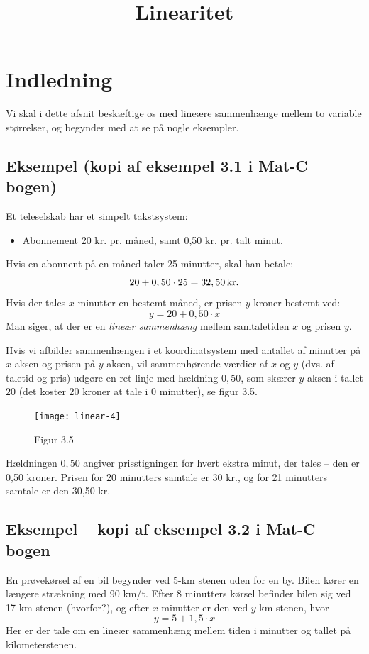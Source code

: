 \documentclass[12pt,oneside,a4paper]{article}
\title{Linearitet}
\date{\vspace{-5ex}}
\begin{document}
\maketitle

\section{Indledning}
Vi skal i dette afsnit beskæftige os med lineære sammenhænge mellem to variable
størrelser, og begynder med at se på nogle eksempler.

\subsection{Eksempel (kopi af eksempel 3.1 i Mat-C bogen)}
Et teleselskab har et simpelt takstsystem:
\begin{itemize}
    \item Abonnement 20 kr. pr. måned, samt 0,50 kr. pr. talt minut.
\end{itemize}
Hvis en abonnent på en måned taler 25 minutter, skal han betale:
$$
20 + 0,50\cdot25 = 32,50 \, {\rm kr}.
$$
Hvis der tales $x$ minutter en bestemt måned, er prisen $y$ kroner bestemt ved:
$$
y = 20 + 0,50\cdot x
$$
Man siger, at der er en {\em lineær sammenhæng} mellem samtaletiden $x$ og prisen $y$.

Hvis vi afbilder sammenhængen i et koordinatsystem med antallet af minutter på
$x$-aksen og prisen på $y$-aksen, vil sammenhørende værdier af $x$ og $y$ (dvs.
af taletid og pris) udgøre en ret linje med hældning $0,50$, som skærer
$y$-aksen i tallet $20$ (det koster 20 kroner at tale i 0 minutter), se figur
3.5.

\begin{figure}[ht]
    \centering
    \texttt{[image: linear-4]}
    \caption{Figur 3.5}
    \label{fig35}
\end{figure}

Hældningen $0,50$ angiver prisstigningen for hvert ekstra minut, der tales --
den er 0,50 kroner.  Prisen for 20 minutters samtale er 30 kr., og for 21
minutters samtale er den 30,50 kr.

\subsection{Eksempel -- kopi af eksempel 3.2 i Mat-C bogen}
En prøvekørsel af en bil begynder ved 5-km stenen uden for en by. Bilen kører
en længere strækning med 90 km/t. Efter 8 minutters kørsel befinder bilen sig
ved 17-km-stenen (hvorfor?), og efter $x$ minutter er den ved $y$-km-stenen,
hvor
$$
y = 5 + 1,5\cdot x
$$
Her er der tale om en lineær sammenhæng mellem tiden i minutter og tallet på
kilometerstenen.
\end{document}
